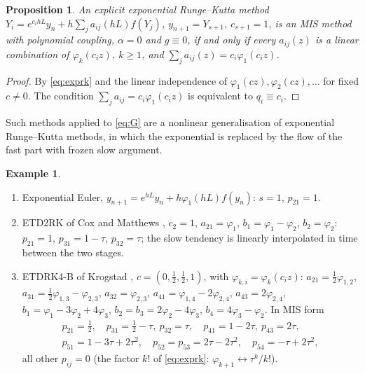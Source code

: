\documentclass[11pt,a4paper]{article}
\newtheorem{proposition}[theorem]{Proposition}
\theoremstyle{definition}
\newtheorem{example}[theorem]{Example}
\theoremstyle{remark}
\begin{document}
\begin{proposition}\label{prop:exprk}
An explicit exponential Runge--Kutta method $Y_i=e^{c_ihL}y_n+h\sum_ja_{ij}(hL)f(Y_j)$, $y_{n+1}=Y_{s+1}$,
$c_{s+1}=1$, is an MIS method with polynomial coupling, $\alpha=0$ and $g\equiv0$, if and only if every $a_{ij}(z)$ is a
linear combination of $\varphi_k(c_iz)$, $k\ge1$, and $\sum_ja_{ij}(z)=c_i\varphi_1(c_iz)$.
\end{proposition}

\begin{proof}
By \eqref{eq:exprk} and the linear independence of $\varphi_1(cz),\varphi_2(cz),\dots$ for fixed $c\ne0$. The condition
$\sum_ja_{ij}=c_i\varphi_1(c_iz)$ is equivalent to $q_i\equiv c_i$.
\end{proof}

Such methods applied to \eqref{eq:G} are a nonlinear generalisation of exponential Runge--Kutta methods, in which the
exponential is replaced by the flow of the fast part with frozen slow argument.

\begin{example}\label{ex:exp}
\begin{enumerate}[label=(\alph*)]
\item Exponential Euler, $y_{n+1}=e^{hL}y_n+h\varphi_1(hL)f(y_n)$: $s=1$, $p_{21}=1$.
\item ETD2RK of Cox and Matthews \cite{CoxMatthews2002}, $c_2=1$, $a_{21}=\varphi_1$, $b_1=\varphi_1-\varphi_2$,
  $b_2=\varphi_2$: $p_{21}=1$, $p_{31}=1-\tau$, $p_{32}=\tau$; the slow tendency is linearly interpolated in time between
  the two stages.
\item ETDRK4-B of Krogstad \cite{Krogstad2005}, $c=(0,\tfrac12,\tfrac12,1)$, with $\varphi_{k,i}=\varphi_k(c_iz)$:
  $a_{21}=\tfrac12\varphi_{1,2}$, $a_{31}=\tfrac12\varphi_{1,3}-\varphi_{2,3}$, $a_{32}=\varphi_{2,3}$,
  $a_{41}=\varphi_{1,4}-2\varphi_{2,4}$, $a_{43}=2\varphi_{2,4}$, $b_1=\varphi_1-3\varphi_2+4\varphi_3$,
  $b_2=b_3=2\varphi_2-4\varphi_3$, $b_4=4\varphi_3-\varphi_2$. In MIS form
  \begin{gather*}
   p_{21}=\tfrac12,\quad p_{31}=\tfrac12-\tau,\ p_{32}=\tau,\quad p_{41}=1-2\tau,\ p_{43}=2\tau,\\
   p_{51}=1-3\tau+2\tau^2,\quad p_{52}=p_{53}=2\tau-2\tau^2,\quad p_{54}=-\tau+2\tau^2,
  \end{gather*}
  all other $p_{ij}=0$ (the factor $k!$ of \eqref{eq:exprk}: $\varphi_{k+1}\leftrightarrow\tau^k/k!$).
\end{enumerate}
\end{example}
\end{document}
